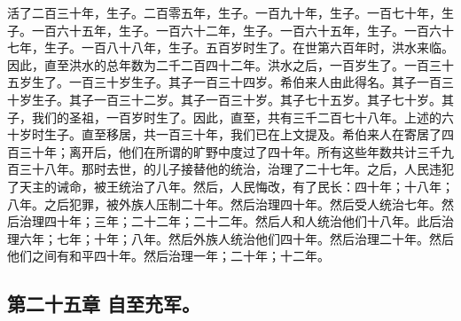 活了二百三十年，生子。二百零五年，生子。一百九十年，生子。一百七十年，生子。一百六十五年，生子。一百六十二年，生子。一百六十五年，生子。一百六十七年，生子。一百八十八年，生子。五百岁时生了。在世第六百年时，洪水来临。因此，直至洪水的总年数为二千二百四十二年。洪水之后，一百岁生了。一百三十五岁生了。一百三十岁生子。其子一百三十四岁。希伯来人由此得名。其子一百三十岁生子。其子一百三十二岁。其子一百三十岁。其子七十五岁。其子七十岁。其子，我们的圣祖，一百岁时生了。因此，直至，共有三千二百七十八年。上述的六十岁时生子。直至移居，共一百三十年，我们已在上文提及。希伯来人在寄居了四百三十年；离开后，他们在所谓的旷野中度过了四十年。所有这些年数共计三千九百三十八年。那时去世，的儿子接替他的统治，治理了二十七年。之后，人民违犯了天主的诫命，被王统治了八年。然后，人民悔改，有了民长：四十年；十八年；八年。之后犯罪，被外族人压制二十年。然后治理四十年。然后受人统治七年。然后治理四十年；三年；二十二年；二十二年。然后人和人统治他们十八年。此后治理六年；七年；十年；八年。然后外族人统治他们四十年。然后治理二十年。然后他们之间有和平四十年。然后治理一年；二十年；十二年。\par


\subsection{第二十五章 自至充军。}

